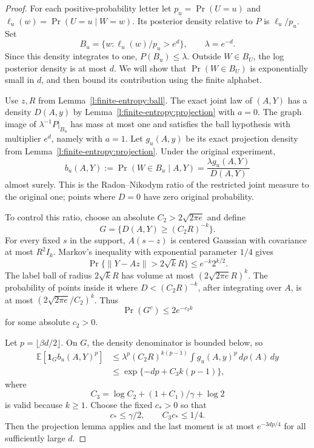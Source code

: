 \begin{proof}
For each positive-probability letter let
\(p_u=\Pr(U=u)\) and
\(\ell_u(w)=\Pr(U=u\mid W=w)\).  Its posterior density relative
to \(P\) is \(\ell_u/p_u\).  Set
\[
 B_u=\{w:\ell_u(w)/p_u>e^d\},\qquad \lambda=e^{-d}.
\]
Since this density integrates to one, \(P(B_u)\le\lambda\).
Outside \(W\in B_U\), the log posterior density is at most \(d\).
We will show that \(\Pr(W\in B_U)\) is exponentially small in
\(d\), and then bound its contribution using the finite alphabet.

Use \(z,R\) from Lemma~\ref{l:finite-entropy:ball}.
The exact joint law of \((A,Y)\) has a density \(D(A,y)\) by
Lemma~\ref{l:finite-entropy:projection} with \(a=0\).
The graph image of \(\lambda^{-1}P|_{B_u}\) has mass at most one
and satisfies the ball hypothesis with multiplier \(e^d\), namely
with \(a=1\).  Let \(g_u(A,y)\) be its exact projection density
from Lemma~\ref{l:finite-entropy:projection}.  Under the original
experiment,
\[
 b_u(A,Y):=\Pr(W\in B_u\mid A,Y)
 =\frac{\lambda g_u(A,Y)}{D(A,Y)}
\]
almost surely.  This is the Radon--Nikodym ratio of the restricted
joint measure to the original one; points where \(D=0\) have zero
original probability.

To control this ratio, choose an absolute
\(C_2>2\sqrt{2\pi e}\) and define
\[
 G=\{D(A,Y)\ge(C_2R)^{-k}\}.
\]
For every fixed \(s\) in the support, \(A(s-z)\) is centered
Gaussian with covariance at most \(R^2I_k\).  Markov's inequality
with exponential parameter \(1/4\) gives
\[
 \Pr\{\|Y-Az\|>2\sqrt kR\}\le e^{-k}2^{k/2}.
\]
The label ball of radius \(2\sqrt kR\) has volume at most
\((2\sqrt{2\pi e}R)^k\).  The probability of points inside it
where \(D<(C_2R)^{-k}\), after integrating over \(A\), is at
most \((2\sqrt{2\pi e}/C_2)^k\).  Thus
\begin{equation}\label{l:finite-entropy:good-probability}
 \Pr(G^c)\le2e^{-c_2k}
\end{equation}
for some absolute \(c_2>0\).

Let \(p=\lfloor\beta d/2\rfloor\).  On \(G\), the density
denominator is bounded below, so
\begin{equation}\label{l:finite-entropy:restricted-moment}
 \begin{split}
 \mathbb E[\mathbf1_G b_u(A,Y)^p]
 &\le \lambda^p(C_2R)^{k(p-1)}
              \int g_u(A,y)^p\,d\rho(A)\,dy\\
 &\le \exp\{-dp+C_3k(p-1)\},
 \end{split}
\end{equation}
where
\[
 C_3=\log C_2+(1+C_1)/\gamma+\log2
\]
is valid because \(k\ge1\).  Choose the fixed \(c_*>0\) so that
\[
 c_*\le\gamma/2,\qquad C_3c_*\le1/4.
\]
Then the projection lemma applies and the last moment is at most
\(e^{-3dp/4}\) for all sufficiently large \(d\).


\end{proof}

